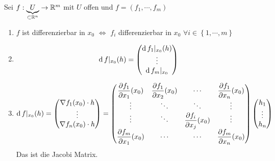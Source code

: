 \begin{Sat}\label{s:line_by_line}
  Sei $f:\underbrace{U}_{\subset\mathbb{R}^n}\rightarrow\mathbb{R}^m$ mit $U$ offen und $f=(f_1,\cdots,f_m)$
  \begin{enumerate}
    \item $f$ ist differenzierbar in $x_0$ $\iff$ $f_i$ differenzierbar in $x_0$ $\forall i\in \left\{ 1,\cdots,m \right\}$
    \item
      \[\operatorname{d} f|_{x_0}(h)= \begin{pmatrix}
        \operatorname{d} f_1|_{x_0}(h)\\
        \vdots \\
        \operatorname{d} f_m|_{x_0}
      \end{pmatrix}\]
    \item 
      \[\operatorname{d} f|_{x_0}(h)= \begin{pmatrix}
        \nabla f_1 (x_0) \cdot h\\
        \vdots \\
        \nabla f_n(x_0)\cdot h
      \end{pmatrix} = 
      \begin{pmatrix}
        \dfrac{\partial f_1}{\partial x_1} (x_0) & \dfrac{\partial f_1}{\partial x_2} (x_0) & \cdots & \dfrac{\partial f_1}{\partial x_n} (x_0)\\
        \vdots & \ddots & \ddots & \vdots \\
        \vdots & \ddots & \dfrac{\partial f_i}{\partial x_j} (x_0)& \vdots \\
        \dfrac{\partial f_m}{\partial x_1} (x_0)& \cdots & \cdots & \dfrac{\partial f_m}{\partial x_n} (x_0) \\
      \end{pmatrix} \begin{pmatrix}
        h_1 \\ \vdots\\ h_n
      \end{pmatrix}
      \]
      Das ist die Jacobi Matrix.
  \end{enumerate}
\end{Sat}


